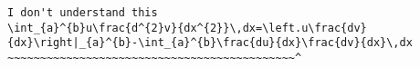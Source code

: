 \begin{verbatim}
I don't understand this
\int_{a}^{b}u\frac{d^{2}v}{dx^{2}}\,dx=\left.u\frac{dv}{dx}\right|_{a}^{b}-\int_{a}^{b}\frac{du}{dx}\frac{dv}{dx}\,dx
~~~~~~~~~~~~~~~~~~~~~~~~~~~~~~~~~~~~~~~~~~~~^
\end{verbatim}
